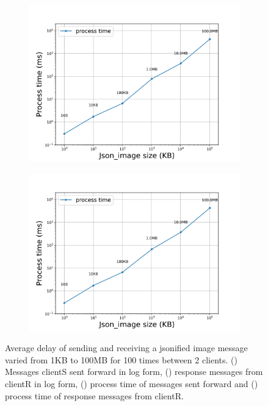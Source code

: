 \begin{figure}[htb]
\begin{subfigure}{0.49\textwidth}
    \end{subfigure}
    \begin{subfigure}{0.49\textwidth}
        \centering
        \includegraphics[width=\textwidth]{figures/tests/proportional_tests/Average_json_image_messages_sending_time_of_100_tests_1KB_to_100MB.png}\hfill 
        \caption{} \label{fig: proportional-imagesize-a}
    \end{subfigure}
    \begin{subfigure}{0.49\textwidth}
        \centering
        \includegraphics[width=\textwidth]{figures/tests/proportional_tests/Average_json_image_messages_receiving_time_of_100_tests_1KB_to_100MB.png}\hfill 
        \caption{} \label{fig: proportional-imagesize-b}
    \end{subfigure}

    \caption{Average delay of sending and receiving a jsonified image message varied from 1KB 
    to 100MB for 100 times between 2 clients. () 
    Messages clientS sent forward in log form, 
    () response messages from clientR in log form, 
    () process time of messages sent forward  
    and () process time of response messages from clientR. 
    \label{fig: proportional-imagesize}}
\end{figure}


